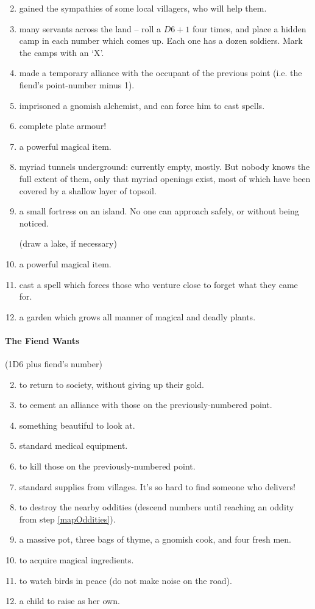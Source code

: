 \begin{multicols}{2}
\begin{enumerate}
\setcounter{enumi}{1}
\item
  gained the sympathies of some local villagers, who will help them.
\item
  many servants across the land -- roll a $D6 + 1$ four times, and place a hidden camp in each number which comes up.
  Each one has a dozen soldiers.
  Mark the camps with an `X'.
\item
  made a temporary alliance with the occupant of the previous point (i.e. the fiend's point-number minus 1).
\item
  imprisoned a gnomish alchemist, and can force him to cast spells.
\item
  complete plate armour!
\item
  a powerful magical item.
\item
  myriad tunnels underground: currently empty, mostly. But nobody knows
  the full extent of them, only that myriad openings exist, most of
  which have been covered by a shallow layer of topsoil.
\item
  a small fortress on an island. No one can approach safely, or without
  being noticed.

  (draw a lake, if necessary)
\item
  a powerful magical item.
\item
  cast a spell which forces those who venture close to forget what they
  came for.
\item
  a garden which grows all manner of magical and deadly plants.
\end{enumerate}

\paragraph{The Fiend Wants}
\label{fiendDesires}

(1D6 plus fiend's number)

\begin{enumerate}
\setcounter{enumi}{1}
\item
  to return to society, without giving up their gold.
\item
  to cement an alliance with those on the previously-numbered point.
\item
  something beautiful to look at.
\item
  standard medical equipment.
\item
  to kill those on the previously-numbered point.
\item
  standard supplies from villages. It's so hard to find someone who
  delivers!
\item
  to destroy the nearby oddities (descend numbers until reaching an oddity from step \ref{mapOddities}).
\item
  a massive pot, three bags of thyme, a gnomish cook, and four fresh men.
\item
  to acquire magical ingredients.
\item
  to watch birds in peace (do not make noise on the road).
\item
  a child to raise as her own.
\end{enumerate}


\end{multicols}
